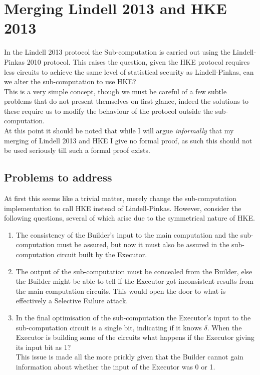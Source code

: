 \documentclass[ %
                    author={Nicholas Tutte},
                supervisor={Prof. Nigel Smart},
                    degree={MEng},
                     title={Secure Two Party Computation},
                  subtitle={A practical comparison of recent protocols},
                      type={Research - GG1K},
                      year={2015} ]{dissertation}
\begin{document}
		\section{Merging Lindell 2013 and HKE 2013}
			In the Lindell 2013 protocol the Sub-computation is carried out using the Lindell-Pinkas 2010 protocol. This raises the question, given the HKE protocol requires less circuits to achieve the same level of statistical security as Lindell-Pinkas, can we alter the sub-computation to use HKE?\\

			This is a very simple concept, though we must be careful of a few subtle problems that do not present themselves on first glance, indeed the solutions to these require us to modify the behaviour of the protocol outside the sub-computation.\\

			At this point it should be noted that while I will argue \emph{informally} that my merging of Lindell 2013 and HKE I give no formal proof, as such this should not be used seriously till such a formal proof exists.

			\subsection{Problems to address}
				At first this seems like a trivial matter, merely change the sub-computation implementation to call HKE instead of Lindell-Pinkas. However, consider the following questions, several of which arise due to the symmetrical nature of HKE.

				\begin{enumerate}
					\item The consistency of the Builder's input to the main computation and the sub-computation must be assured, but now it must also be assured in the sub-computation circuit built by the Executor.
					
					\item The output of the sub-computation must be concealed from the Builder, else the Builder might be able to tell if the Executor got inconsistent results from the main computation circuits. This would open the door to what is effectively a Selective Failure attack.

					\item In the final optimisation of the sub-computation the Executor's input to the sub-computation circuit is a single bit, indicating if it knows $\delta$. When the Executor is building some of the circuits what happens if the Executor giving its input bit as $1$?\\

					This issue is made all the more prickly given that the Builder cannot gain information about whether the input of the Executor was 0 or 1.
				\end{enumerate}
\end{document}
